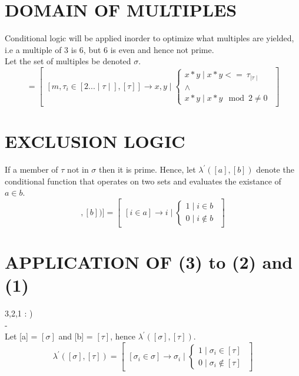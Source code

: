 \documentclass[11pt]{article}
\begin{document}
\section{DOMAIN OF MULTIPLES}
Conditional logic will be applied inorder to optimize what multiples are yielded, i.e a multiple of 3 is 6, but 6 is even and hence not
prime.\\
Let the set of multiples be denoted $\sigma$.
\begin{equation}[\sigma]=\begin{bmatrix} [m,\tau_i \in [2...\mid\tau\mid],[\tau]]\rightarrow x,y \mid
\begin{cases}x*y\mid x*y <= \ \tau_{\mid\tau\mid}\\ \land\\x*y\mid x*y \mod 2 \not = 0\end{cases}\end{bmatrix}
\end{equation}
\section{EXCLUSION LOGIC}
If a member of $\tau$ not in $\sigma$ then it is prime.
Hence, let $\lambda^\prime([a],[b])$ denote the conditional function that operates on two sets and evaluates the existance of $a\in b$.
\begin{equation}[\lambda^\prime([a],[b])] =\begin{bmatrix} [i \in a]\rightarrow i\mid \begin{cases}1 \mid i \in b\\ 0 \mid i 
\not\in b\end{cases}\end{bmatrix}\end{equation}

\section{APPLICATION OF (3) to (2) and (1)}
{\color{red}3,2,1 : )}\\
{\color{white}-}
\\
Let [a] = $[\sigma]$ and [b] = $[\tau]$, hence $\lambda^\prime([\sigma],[\tau])$.
\begin{equation} \lambda^\prime([\sigma],[\tau])= \begin{bmatrix}[\sigma_i\in\sigma]\rightarrow\sigma_i\mid
	\begin{cases}1 \mid \sigma_i \in [\tau]\\ 0 \mid \sigma_i \not\in [\tau]\end{cases}\end{bmatrix} \end{equation}
\end{document}
